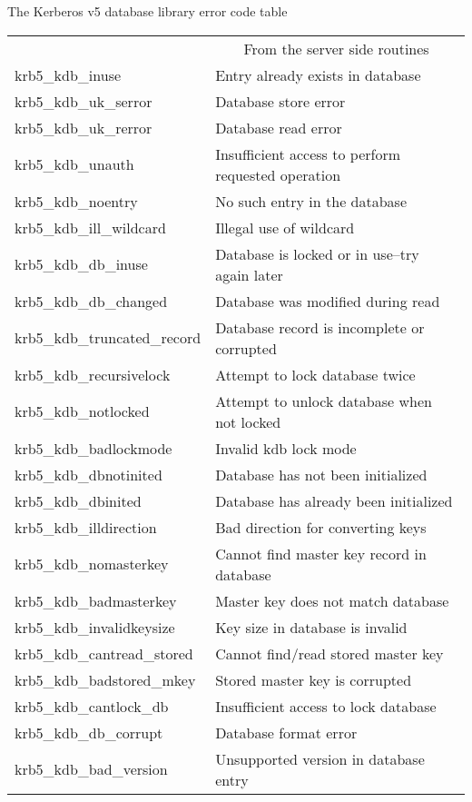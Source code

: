 The Kerberos v5 database library error code table

\begin{small}
\begin{tabular}{ll}
&\multicolumn{1}{c}{From the server side routines} \\
{\sc krb5_kdb_inuse }&	Entry already exists in database\\
{\sc krb5_kdb_uk_serror }&	Database store error\\
{\sc krb5_kdb_uk_rerror }&	Database read error\\
{\sc krb5_kdb_unauth }&	Insufficient access to perform requested operation\\
{\sc krb5_kdb_noentry }&	No such entry in the database\\
{\sc krb5_kdb_ill_wildcard }& Illegal use of wildcard\\
{\sc krb5_kdb_db_inuse }&	Database is locked or in use--try again later\\
{\sc krb5_kdb_db_changed }&	Database was modified during read\\
{\sc krb5_kdb_truncated_record }&	Database record is incomplete or corrupted\\
{\sc krb5_kdb_recursivelock }&	Attempt to lock database twice\\
{\sc krb5_kdb_notlocked }&		Attempt to unlock database when not locked\\
{\sc krb5_kdb_badlockmode }&	Invalid kdb lock mode\\
{\sc krb5_kdb_dbnotinited }&	Database has not been initialized\\
{\sc krb5_kdb_dbinited }&		Database has already been initialized\\
{\sc krb5_kdb_illdirection }&	Bad direction for converting keys\\
{\sc krb5_kdb_nomasterkey }&	Cannot find master key record in database\\
{\sc krb5_kdb_badmasterkey }&	Master key does not match database\\
{\sc krb5_kdb_invalidkeysize }&	Key size in database is invalid\\
{\sc krb5_kdb_cantread_stored }&	Cannot find/read stored master key\\
{\sc krb5_kdb_badstored_mkey }&	Stored master key is corrupted\\
{\sc krb5_kdb_cantlock_db }&	Insufficient access to lock database \\
{\sc krb5_kdb_db_corrupt }&		Database format error\\
{\sc krb5_kdb_bad_version }&	Unsupported version in database entry \\
\end{tabular}
\end{small}

